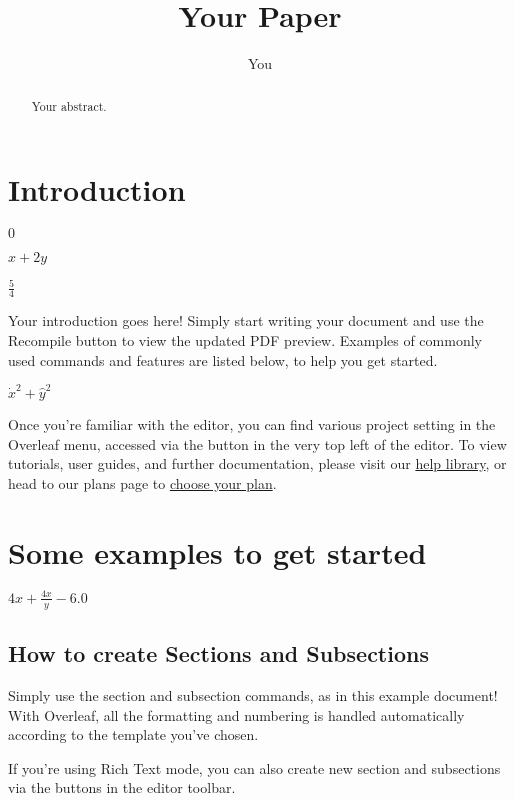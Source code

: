 \documentclass{article}
\title{Your Paper}
\author{You}
\begin{document}
\maketitle

\begin{abstract}
Your abstract.
\end{abstract}





\section{Introduction}

$0$

$x + 2 y$

$\frac{5}{4}$

Your introduction goes here! Simply start writing your document and use the Recompile button to view the updated PDF preview. Examples of commonly used commands and features are listed below, to help you get started.

$\dot{x}^{2} + \hat{y}^{2}$

Once you're familiar with the editor, you can find various project setting in the Overleaf menu, accessed via the button in the very top left of the editor. To view tutorials, user guides, and further documentation, please visit our \href{https://www.overleaf.com/learn}{help library}, or head to our plans page to \href{https://www.overleaf.com/user/subscription/plans}{choose your plan}.

\section{Some examples to get started}
$4 x + \frac{4 x}{y} - 6.0$

\subsection{How to create Sections and Subsections}

Simply use the section and subsection commands, as in this example document! With Overleaf, all the formatting and numbering is handled automatically according to the template you've chosen. 


If you're using Rich Text mode, you can also create new section and subsections via the buttons in the editor toolbar.
\end{document}

